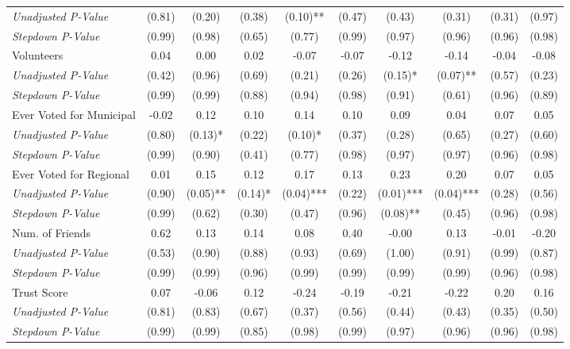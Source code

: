 \begin{tabular}{l c c c c c c c c c}
\quad \textit{Unadjusted P-Value} & (0.81) & (0.20) & (0.38) & (0.10)** & (0.47) & (0.43) & (0.31) & (0.31) & (0.97) \\
\quad \textit{Stepdown P-Value} & (0.99) & (0.98) & (0.65) & (0.77) & (0.99) & (0.97) & (0.96) & (0.96) & (0.98) \\
Volunteers & 0.04 & 0.00 & 0.02 & -0.07 & -0.07 & -0.12 & -0.14 & -0.04 & -0.08 \\
\quad \textit{Unadjusted P-Value} & (0.42) & (0.96) & (0.69) & (0.21) & (0.26) & (0.15)* & (0.07)** & (0.57) & (0.23) \\
\quad \textit{Stepdown P-Value} & (0.99) & (0.99) & (0.88) & (0.94) & (0.98) & (0.91) & (0.61) & (0.96) & (0.89) \\
Ever Voted for Municipal & -0.02 & 0.12 & 0.10 & 0.14 & 0.10 & 0.09 & 0.04 & 0.07 & 0.05 \\
\quad \textit{Unadjusted P-Value} & (0.80) & (0.13)* & (0.22) & (0.10)* & (0.37) & (0.28) & (0.65) & (0.27) & (0.60) \\
\quad \textit{Stepdown P-Value} & (0.99) & (0.90) & (0.41) & (0.77) & (0.98) & (0.97) & (0.97) & (0.96) & (0.98) \\
Ever Voted for Regional & 0.01 & 0.15 & 0.12 & 0.17 & 0.13 & 0.23 & 0.20 & 0.07 & 0.05 \\
\quad \textit{Unadjusted P-Value} & (0.90) & (0.05)** & (0.14)* & (0.04)*** & (0.22) & (0.01)*** & (0.04)*** & (0.28) & (0.56) \\
\quad \textit{Stepdown P-Value} & (0.99) & (0.62) & (0.30) & (0.47) & (0.96) & (0.08)** & (0.45) & (0.96) & (0.98) \\
Num. of Friends & 0.62 & 0.13 & 0.14 & 0.08 & 0.40 & -0.00 & 0.13 & -0.01 & -0.20 \\
\quad \textit{Unadjusted P-Value} & (0.53) & (0.90) & (0.88) & (0.93) & (0.69) & (1.00) & (0.91) & (0.99) & (0.87) \\
\quad \textit{Stepdown P-Value} & (0.99) & (0.99) & (0.96) & (0.99) & (0.99) & (0.99) & (0.99) & (0.96) & (0.98) \\
Trust Score & 0.07 & -0.06 & 0.12 & -0.24 & -0.19 & -0.21 & -0.22 & 0.20 & 0.16 \\
\quad \textit{Unadjusted P-Value} & (0.81) & (0.83) & (0.67) & (0.37) & (0.56) & (0.44) & (0.43) & (0.35) & (0.50) \\
\quad \textit{Stepdown P-Value} & (0.99) & (0.99) & (0.85) & (0.98) & (0.99) & (0.97) & (0.96) & (0.96) & (0.98) \\
\bottomrule
\end{tabular}
